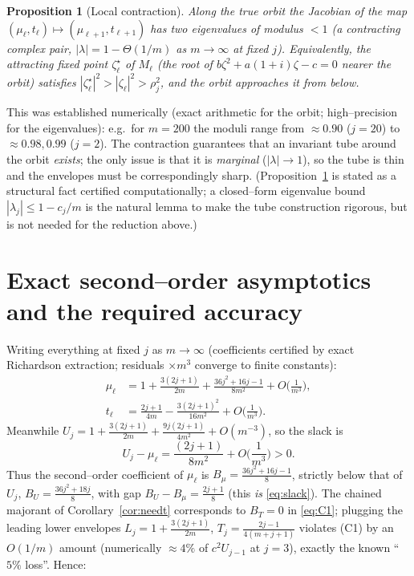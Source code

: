 \documentclass[11pt]{article}
\newtheorem{proposition}{Proposition}
\theoremstyle{definition}
\begin{document}
\begin{proposition}[Local contraction]\label{prop:contract}
Along the true orbit the Jacobian of the map $(\mu_\ell,t_\ell)\mapsto
(\mu_{\ell+1},t_{\ell+1})$ has two eigenvalues of modulus $<1$ (a contracting
complex pair, $|\lambda|=1-\Theta(1/m)$ as $m\to\infty$ at fixed $j$).
Equivalently, the attracting fixed point $\zeta^\star_\ell$ of $M_\ell$
(the root of $b\zeta^2+a(1+i)\zeta-c=0$ nearer the orbit) satisfies
$|\zeta^\star_\ell|^2>|\zeta_\ell|^2>\rho_j^2$, and the orbit approaches it from
below.
\end{proposition}

This was established numerically (exact arithmetic for the orbit; high--precision
for the eigenvalues): e.g.\ for $m=200$ the moduli range from $\approx 0.90$
($j=20$) to $\approx 0.98,0.99$ ($j=2$). The contraction guarantees that an
invariant tube around the orbit \emph{exists}; the only issue is that it is
\emph{marginal} ($|\lambda|\to1$), so the tube is thin and the envelopes must be
correspondingly sharp. (Proposition~\ref{prop:contract} is stated as a structural
fact certified computationally; a closed--form eigenvalue bound
$|\lambda_j|\le 1-c_j/m$ is the natural lemma to make the tube construction
rigorous, but is not needed for the reduction above.)

\section{Exact second--order asymptotics and the required accuracy}
\label{sec:asym}

Writing everything at fixed $j$ as $m\to\infty$ (coefficients certified by exact
Richardson extraction; residuals $\times m^3$ converge to finite constants):
\begin{align}
\mu_\ell&=1+\frac{3(2j+1)}{2m}+\frac{36j^2+16j-1}{8m^2}+O\!\Big(\frac1{m^3}\Big),
\label{eq:muexp}\\
t_\ell&=\frac{2j+1}{4m}-\frac{3(2j+1)^2}{16m^2}+O\!\Big(\frac1{m^3}\Big).
\label{eq:texp}
\end{align}
Meanwhile $U_j=1+\frac{3(2j+1)}{2m}+\frac{9j(2j+1)}{4m^2}+O(m^{-3})$, so the slack
is
\begin{equation}\label{eq:slack}
U_j-\mu_\ell=\frac{(2j+1)}{8m^2}+O\!\Big(\frac1{m^3}\Big)>0 .
\end{equation}
Thus the second--order coefficient of $\mu_\ell$ is
$B_\mu=\frac{36j^2+16j-1}{8}$, strictly below that of $U_j$,
$B_U=\frac{36j^2+18j}{8}$, with gap $B_U-B_\mu=\frac{2j+1}{8}$
(this \emph{is} \eqref{eq:slack}). The chained majorant of
Corollary~\ref{cor:needt} corresponds to $B_T=0$ in \eqref{eq:C1}; plugging the
leading lower envelopes $L_j=1+\frac{3(2j+1)}{2m}$, $T_j=\frac{2j-1}{4(m+j+1)}$
violates (C1) by an $O(1/m)$ amount (numerically $\approx4\%$ of $c^2U_{j-1}$ at
$j=3$), exactly the known ``$5\%$ loss''. Hence:
\end{document}
